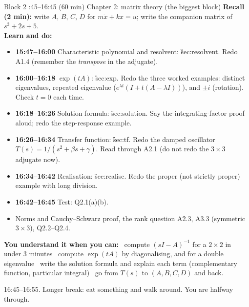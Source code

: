 \begin{sessionbox}{Block 2 :45--16:45 (60 min) \quad Chapter 2: matrix theory (the biggest block)}
\textbf{Recall (2 min):} write $A$, $B$, $C$, $D$ for $m\ddot x+kx=u$; write the companion matrix of $s^3+2s+5$.\\
\textbf{Learn and do:}
\begin{itemize}
\item[\core] \textbf{15:47--16:00} Characteristic polynomial and resolvent: \G{sec:resolvent}. Redo A1.4 (remember the \emph{transpose} in the adjugate).
\item[\core] \textbf{16:00--16:18} $\exp(tA)$: \G{sec:exp}. Redo the three worked examples: distinct eigenvalues, repeated eigenvalue ($e^{\lambda t}(I+t(A-\lambda I))$), and $\pm i$ (rotation). Check $t=0$ each time.
\item[\core] \textbf{16:18--16:26} Solution formula: \G{sec:solution}. Say the integrating-factor proof aloud; redo the step-response example.
\item[\core] \textbf{16:26--16:34} Transfer function: \G{sec:tf}. Redo the damped oscillator $T(s)=1/(s^2+\beta s+\gamma)$. Read through A2.1 (do not redo the $3\times3$ adjugate now).
\item[\core] \textbf{16:34--16:42} Realisation: \G{sec:realise}. Redo the proper (not strictly proper) example with long division.
\item[\core] \textbf{16:42--16:45} Test: Q2.1(a)(b).
\item[\extra] Norms and Cauchy--Schwarz proof, the rank question A2.3, A3.3 (symmetric $3\times3$), Q2.2--Q2.4.
\end{itemize}
\textbf{You understand it when you can:}
\tick\ compute $(sI-A)^{-1}$ for a $2\times2$ in under 3 minutes \quad
\tick\ compute $\exp(tA)$ by diagonalising, and for a double eigenvalue \quad
\tick\ write the solution formula and explain each term (complementary function, particular integral) \quad
\tick\ go from $T(s)$ to $(A,B,C,D)$ and back.
\end{sessionbox}

\begin{breakbox}16:45--16:55. Longer break: eat something and walk around. You are halfway through.\end{breakbox}

